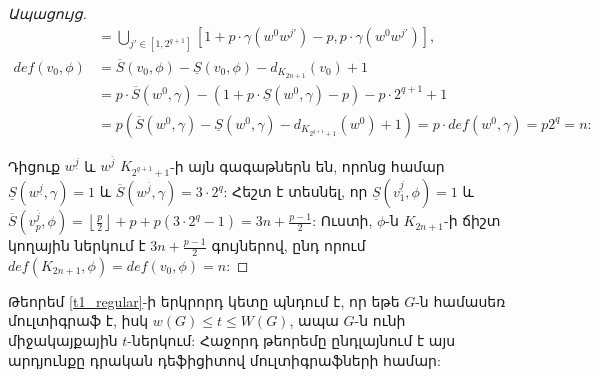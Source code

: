 \begin{proof}[Ապացույց]
\begin{align*}
    &= \bigcup\limits_{j'\in [1, 2^{q+1}]} {\left[ 1 + p\cdot\gamma(w^0w^{j'}) - p, p\cdot\gamma(w^0w^{j'}) \right]},\\
    def(v_0, \phi) &= \overline{S}(v_0, \phi) - \underline{S}(v_0, \phi)-d_{K_{2n+1}}(v_0) + 1\\
    &= p\cdot\overline{S}(w^0,\gamma) - (1 + p\cdot\underline{S}(w^0,\gamma) - p)-p\cdot2^{q+1} + 1\\
    &= p\left(\overline{S}(w^0,\gamma) - \underline{S}(w^0,\gamma)-d_{K_{2^{q+1}+1}}(w^0) + 1\right) = p\cdot def(w^0,\gamma) = p2^q = n:
\end{align*}

Դիցուք $w^{\underline{j}}$ և $w^{\overline{j}}$ $K_{2^{q+1}+1}$-ի այն գագաթներն են, որոնց համար $\underline{S}\left(w^{\underline{j}}, \gamma\right) = 1$ և $\overline{S}\left(w^{\overline{j}}, \gamma\right) = 3\cdot2^q$: Հեշտ է տեսնել, որ $\underline{S}\left(v^{\underline{j}}_{1},\phi\right) = 1$ և $\overline{S}\left(v^{\overline{j}}_{p},\phi\right) = \left\lfloor \frac{p}{2} \right\rfloor + p + p\left(3\cdot2^q - 1\right) = 3n + \frac{p-1}{2}$: Ուստի, $\phi$-ն $K_{2n+1}$-ի ճիշտ կողային ներկում է $3n + \frac{p-1}{2}$ գույներով, ընդ որում $def(K_{2n+1}, \phi) = def\left(v_0, \phi\right) = n$:
\end{proof}

Թեորեմ \ref{t1_regular}-ի երկրորդ կետը պնդում է, որ եթե $G$-ն համասեռ մուլտիգրաֆ է, իսկ $w(G) \leq t \leq W(G)$, ապա $G$-ն ունի միջակայքային $t$-ներկում: Հաջորդ թեորեմը ընդլայնում է այս արդյունքը դրական դեֆիցիտով մուլտիգրաֆների համար:

